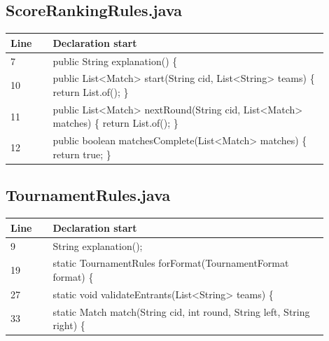 \subsection*{ScoreRankingRules.java}
\begin{longtable}{p{0.12\linewidth}p{0.78\linewidth}}\toprule Line & Declaration start\\\midrule\endhead
7 & public String explanation() \{\\
10 & public List<Match> start(String cid, List<String> teams) \{ return List.of(); \}\\
11 & public List<Match> nextRound(String cid, List<Match> matches) \{ return List.of(); \}\\
12 & public boolean matchesComplete(List<Match> matches) \{ return true; \}\\
\bottomrule\end{longtable}
\subsection*{TournamentRules.java}
\begin{longtable}{p{0.12\linewidth}p{0.78\linewidth}}\toprule Line & Declaration start\\\midrule\endhead
9 & String explanation();\\
19 & static TournamentRules forFormat(TournamentFormat format) \{\\
27 & static void validateEntrants(List<String> teams) \{\\
33 & static Match match(String cid, int round, String left, String right) \{\\
\bottomrule\end{longtable}
